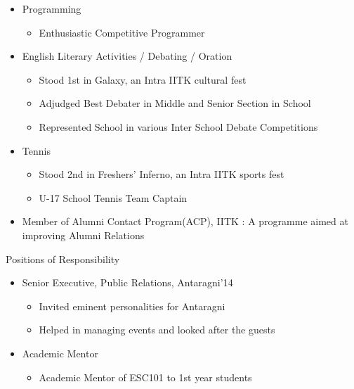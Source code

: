 \documentclass{article}
\begin{document}
\begin{itemize}
\item Programming
	\begin{itemize}
	\item Enthusiastic Competitive Programmer
	\end{itemize}
\item English Literary Activities / Debating / Oration
	\begin{itemize}
	\item Stood 1st in Galaxy, an Intra IITK cultural fest 
	\item Adjudged Best Debater in Middle and Senior Section in School
	\item Represented School in various Inter School Debate Competitions
	\end{itemize}
\item Tennis
	\begin{itemize}
	\item Stood 2nd in Freshers' Inferno, an Intra IITK sports fest 
	\item U-17 School Tennis Team Captain
	\end{itemize}
\item Member of Alumni Contact Program(ACP), IITK : A programme aimed at improving Alumni Relations
\end{itemize}
\vspace{10pt}
{\Large Positions of Responsibility}
\begin{itemize}
\item Senior Executive, Public Relations, Antaragni’14
	\begin{itemize}
	\item Invited eminent personalities for Antaragni
	\item Helped in managing events and looked after the guests
	\end{itemize}
\item Academic Mentor
\begin{itemize}
\item Academic Mentor of ESC101 to 1st year students
\end{itemize}
\end{itemize}
\end{document}
